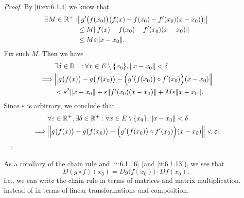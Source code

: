 \begin{proof}
  By \cref{ii:ex:6.1.4} we know that
  \begin{align*}
    \exists M \in \R^+ : & \norm*{g'\big(f(x_0)\big) \big(f(x) - f(x_0) - f'(x_0) (x - x_0)\big)} \\
                         & \leq M \norm*{f(x) - f(x_0) - f'(x_0) (x - x_0)}                       \\
                         & \leq M \varepsilon \norm*{x - x_0}.
  \end{align*}
  Fix such \(M\).
  Then we have
  \begin{align*}
             & \exists \delta \in \R^+ : \forall x \in E \setminus \set{x_0}, \norm*{x - x_0} < \delta                 \\
    \implies & \norm*{g\big(f(x)\big) - g\big(f(x_0)\big) - \Big(g'\big(f(x_0)\big) \circ f'(x_0)\Big) (x - x_0)}      \\
             & < \varepsilon^2 \norm*{x - x_0} + \varepsilon \norm*{f'(x_0)(x - x_0)} + M \varepsilon \norm*{x - x_0}.
  \end{align*}
  Since \(\varepsilon\) is arbitrary, we conclude that
  \begin{align*}
             & \forall \varepsilon \in \R^+, \exists \delta \in \R^+ : \forall x \in E \setminus \set{x_0}, \norm*{x - x_0} < \delta \\
    \implies & \norm*{g\big(f(x)\big) - g\big(f(x_0)\big) - \Big(g'\big(f(x_0)\big) \circ f'(x_0)\Big) (x - x_0)} < \varepsilon.
  \end{align*}
\end{proof}

\begin{note}
  As a corollary of the chain rule and \cref{ii:6.1.16} (and \cref{ii:6.1.13}), we see that
  \[
    D (g \circ f)(x_0) = D g\big(f(x_0)\big) \cdot D f(x_0);
  \]
  i.e., we can write the chain rule in terms of matrices and matrix multiplication, instead of in terms of linear transformations and composition.
\end{note}

